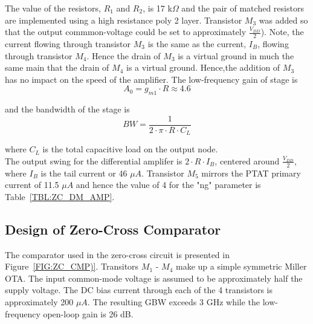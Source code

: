 \documentclass[12pt, onecolumn]{IEEEtran}
\begin{document}
The value of the resistors, $R_1$ and $R_2$, is 17 k$\Omega$ and the pair of matched resistors are implemented using a high resistance poly 2 layer. Transistor $M_3$ was added so that the output commmon-voltage could be set to approximately $\frac{V_{DD}}{2}$). Note, the current flowing through transistor $M_3$ is the same as the current, $I_B$, flowing through transistor $M_4$. Hence the drain of $M_3$ is a virtual ground in much the same main that the drain of $M_4$ is a virtual ground. Hence,the addition of $M_3$ has no impact on the speed of the amplifier. The low-frequency gain of stage is \\

\begin{equation}
A_0 = g_{m1} \cdot R \approx 4.6
\end{equation}


and the bandwidth of the stage is \\

\begin{equation}
BW = \frac{1}{2 \cdot \pi \cdot R \cdot C_L}
\end{equation}


where $C_L$ is the total capacitive load on the output node. \\


The output swing for the differential amplifer is $ 2 \cdot R \cdot I_B$, centered around $\frac{V_{DD}}{2}$, where $I_B$ is the tail current or 46 $\mu A$.  Transistor $M_5$ mirrors the PTAT primary current of 11.5 $\mu A$ and hence the value of 4 for the "ng" parameter is Table~\ref{TBL:ZC_DM_AMP}.\\

\subsection*{Design of Zero-Cross Comparator}


The comparator used in the zero-cross circuit is presented in Figure~\ref{FIG:ZC_CMP)}. Transitors $M_1$ - $M_4$ make up a simple symmetric Miller OTA. The input common-mode voltage is assumed to be approximately half the supply voltage. The DC bias current through each of the 4 transistors is approximately 200 $\mu A$.  The resulting GBW exceeds 3 GHz while the low-frequency open-loop gain is 26 dB.  \\
\end{document}
